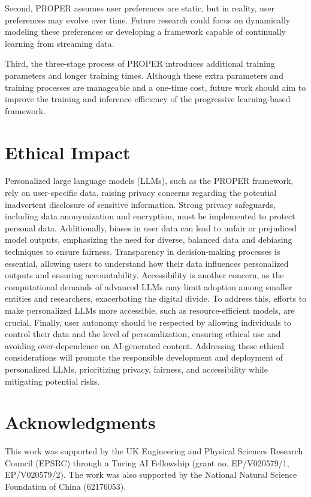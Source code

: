 \documentclass[11pt]{article}
\begin{document}
Second, PROPER assumes user preferences are static, but in reality, user preferences may evolve over time. 
Future research could focus on dynamically modeling these preferences or developing a framework capable of continually learning from streaming data.

Third, the three-stage process of PROPER introduces additional training parameters and longer training times. 
Although these extra parameters and training processes are manageable and a one-time cost, future work should aim to improve the training and inference efficiency of the progressive learning-based framework.


\section*{Ethical Impact}
Personalized large language models (LLMs), such as the PROPER framework, rely on user-specific data, raising privacy concerns regarding the potential inadvertent disclosure of sensitive information. Strong privacy safeguards, including data anonymization and encryption, must be implemented to protect personal data. Additionally, biases in user data can lead to unfair or prejudiced model outputs, emphasizing the need for diverse, balanced data and debiasing techniques to ensure fairness. Transparency in decision-making processes is essential, allowing users to understand how their data influences personalized outputs and ensuring accountability. Accessibility is another concern, as the computational demands of advanced LLMs may limit adoption among smaller entities and researchers, exacerbating the digital divide. To address this, efforts to make personalized LLMs more accessible, such as resource-efficient models, are crucial. Finally, user autonomy should be respected by allowing individuals to control their data and the level of personalization, ensuring ethical use and avoiding over-dependence on AI-generated content. Addressing these ethical considerations will promote the responsible development and deployment of personalized LLMs, prioritizing privacy, fairness, and accessibility while mitigating potential risks.


\section*{Acknowledgments}
This work was supported by the UK Engineering and Physical Sciences Research Council (EPSRC) through a Turing AI Fellowship (grant no. EP/V020579/1, EP/V020579/2). 
The work was also supported by the National Natural Science Foundation of China (62176053).
\end{document}
